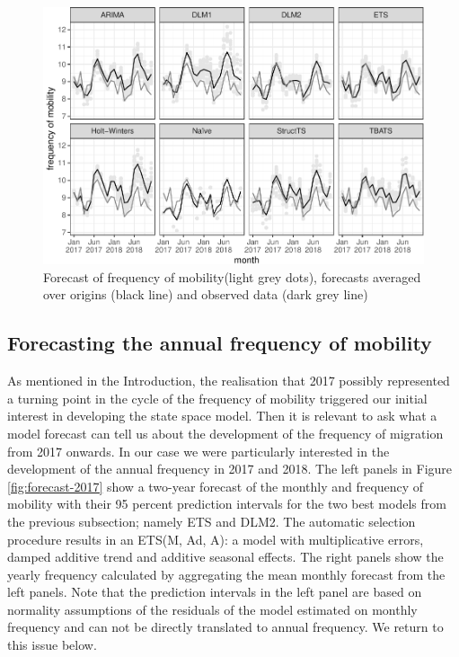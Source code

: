 \documentclass[12pt, a4paper]{article}
\begin{document}
\begin{figure}[H]
  \caption{\label{fig:forecast-2017-2018}Forecast of frequency of mobility(light grey dots),
forecasts averaged over origins (black line) and observed data (dark grey
line) }
\centering
\includegraphics[scale = 0.8]{../figs/freq--forecast-2017-2018-1.pdf}
\end{figure}

\subsection{Forecasting the annual frequency of mobility}\label{forecasting-the-annual-frequency-of-mobility}

As mentioned in the Introduction, the realisation that 2017 possibly
represented a turning point in the cycle of the frequency of mobility
triggered our initial interest in developing the state space model. Then
it is relevant to ask what a model forecast can tell us about
the development of the frequency of migration from 2017 onwards. In our
case we were particularly interested in the development of the annual
frequency in 2017 and 2018. The left panels in Figure \ref{fig:forecast-2017}
show a two-year forecast of the monthly and frequency of
mobility with their 95 percent prediction intervals for the two best models from the previous subsection; namely ETS and DLM2. The automatic selection
procedure results in an ETS(M, Ad, A): a model with multiplicative
errors, damped additive trend and additive seasonal effects. The right panels show the yearly frequency calculated by aggregating the mean monthly forecast from the left panels. Note that the prediction intervals in the left panel are based on normality assumptions of the residuals of the model estimated on monthly frequency and can not be directly translated to annual frequency. We return to this issue below.  
\end{document}
